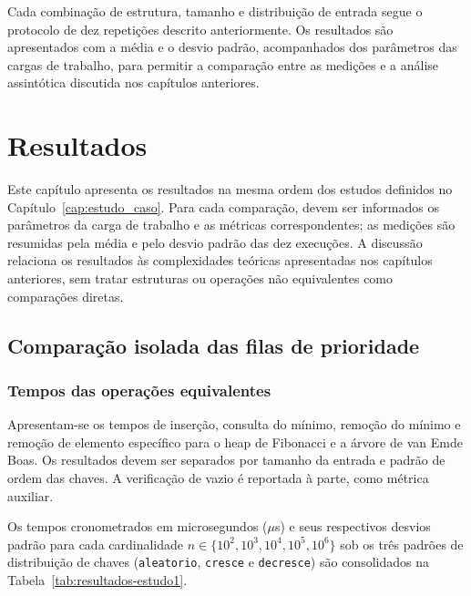 \documentclass[12pt,a4paper]{report}
\begin{document}
Cada combinação de estrutura, tamanho e distribuição de entrada segue o protocolo de dez repetições descrito anteriormente. Os resultados são apresentados com a média e o desvio padrão, acompanhados dos parâmetros das cargas de trabalho, para permitir a comparação entre as medições e a análise assintótica discutida nos capítulos anteriores.


\chapter{Resultados}
\label{cap:resultados}

Este capítulo apresenta os resultados na mesma ordem dos estudos definidos no Capítulo~\ref{cap:estudo_caso}. Para cada comparação, devem ser informados os parâmetros da carga de trabalho e as métricas correspondentes; as medições são resumidas pela média e pelo desvio padrão das dez execuções. A discussão relaciona os resultados às complexidades teóricas apresentadas nos capítulos anteriores, sem tratar estruturas ou operações não equivalentes como comparações diretas.

\section{Comparação isolada das filas de prioridade}

\subsection{Tempos das operações equivalentes}

Apresentam-se os tempos de inserção, consulta do mínimo, remoção do mínimo e remoção de elemento específico para o heap de Fibonacci e a árvore de van Emde Boas. Os resultados devem ser separados por tamanho da entrada e padrão de ordem das chaves. A verificação de vazio é reportada à parte, como métrica auxiliar.

Os tempos cronometrados em microsegundos ($\mu$s) e seus respectivos desvios padrão para cada cardinalidade $n \in \{10^2, 10^3, 10^4, 10^5, 10^6\}$ sob os três padrões de distribuição de chaves (\texttt{aleatorio}, \texttt{cresce} e \texttt{decresce}) são consolidados na Tabela~\ref{tab:resultados-estudo1}.
\end{document}
